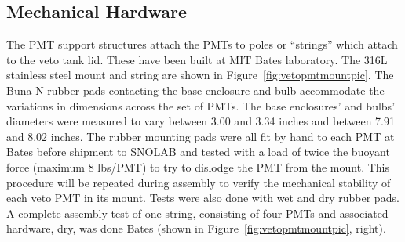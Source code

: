 \documentclass{JINST}
\begin{document}
\subsection{Mechanical Hardware}
%
The PMT support structures attach the PMTs to poles or
``strings'' which attach to the veto tank lid.  These  have been built at
MIT Bates laboratory. 
The 316L stainless steel mount and string are shown in
Figure~\ref{fig:vetopmtmountpic}.  The
Buna-N rubber pads contacting the base enclosure and bulb accommodate
the variations in dimensions across the set of PMTs. The base
enclosures' and bulbs' diameters were measured to vary between 3.00
and 3.34 inches and between 7.91 and 8.02 inches. The rubber mounting
pads were all fit by hand to each PMT at Bates before shipment to
SNOLAB and tested with a load of twice the buoyant force (maximum 8
lbs/PMT) to try to dislodge the PMT from the mount.  This procedure
will be repeated during assembly to verify the mechanical stability of
each veto PMT in its mount.  Tests were also done with wet and dry
rubber pads.  A complete assembly test of one string, consisting of
four PMTs and associated hardware, dry, was done Bates (shown in Figure~\ref{fig:vetopmtmountpic}, right).

%
\end{document}
